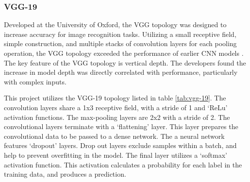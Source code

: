 		\subsubsection{VGG-19}

		Developed at the University of Oxford, the VGG topology was designed to increase accuracy for image recognition tasks. Utilizing a small receptive field, simple construction, and multiple stacks of convolution layers for each pooling operation, the VGG topology exceeded the performance of earlier CNN models \cite{VGG-19}. The key feature of the VGG topology is vertical depth. The developers found the increase in model depth was directly correlated with performance, particularly with complex inputs.

		This project utilizes the VGG-19 topology listed in table \ref{tab:vgg-19}. The convolution layers share a 1x3 receptive field, with a stride of 1 and `ReLu' activation functions. The max-pooling layers are 2x2 with a stride of 2. The convolutional layers terminate with a `flattening' layer. This layer prepares the convolutional data to be passed to a dense network. The a neural network features `dropout' layers. Drop out layers exclude samples within a batch, and help to prevent overfitting in the model. The final layer utilizes a `softmax' activation function. This activation calculates a probability for each label in the training data, and produces a prediction.

